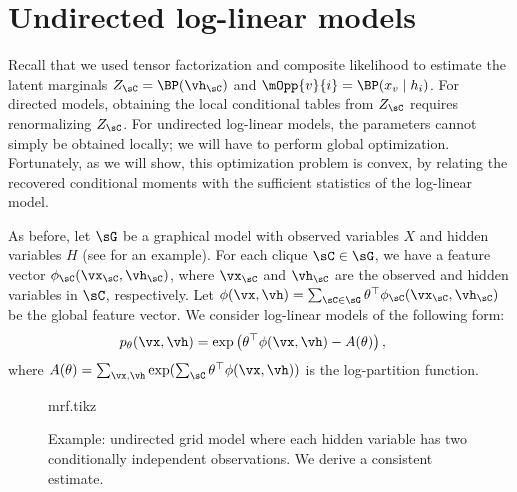 \section{Undirected log-linear models}
\label{sec:undirected}

Recall that we used tensor factorization and composite likelihood
to estimate the latent marginals $Z_\sC = \BP(\vh_\sC)$ and $\mOpp{v}{i} = \BP(x_v \mid h_i)$.
For directed models, obtaining the local conditional tables from $Z_\sC$ requires
renormalizing $Z_\sC$.
For undirected log-linear models, the parameters cannot simply be obtained locally;
we will have to perform global optimization.
Fortunately, as we will show, this optimization problem is convex,
by relating the recovered conditional moments with the sufficient statistics of
the log-linear model.

As before, let $\sG$ be a graphical model with observed variables $X$ and hidden variables $H$
(see  for an example).
For each clique $\sC \in \sG$, we have a feature vector $\phi_\sC(\vx_\sC, \vh_\sC)$,
where $\vx_\sC$ and $\vh_\sC$ are the observed and hidden variables in $\sC$, respectively.
Let $\phi(\vx, \vh) = \sum_{\sC \in \sG} \theta^\top \phi_\sC(\vx_\sC,\vh_\sC)$ be the global feature vector.
We consider log-linear models of the following form:
\begin{align}
p_\theta(\vx, \vh) &= \exp\left( \theta^\top \phi(\vx,\vh) - A(\theta) \right),
\end{align}
where $A(\theta) = \sum_{\vx, \vh}  \exp( \sum_\sC \theta^\top \phi(\vx,\vh) )$ is the log-partition function.

\begin{figure}
  \label{fig:examples-mrf}
  \centering
  {mrf.tikz}
  \caption{Example: undirected grid model where each hidden variable has two
  conditionally independent observations.
  We derive a consistent estimate.}
\end{figure}


